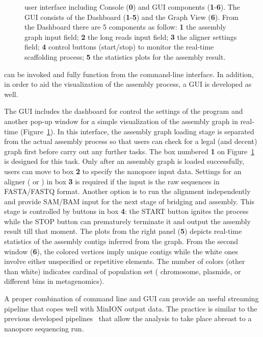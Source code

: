 \begin{figure}[!hpt]
{{    }
}
\caption[\npgraph{} user interface]{\npgraph{} user interface including Console (\textbf{0}) and GUI components (\textbf{1}-\textbf{6}). The GUI consists of the Dashboard (\textbf{1}-\textbf{5}) and the Graph View (\textbf{6}). From the Dashboard there are 5 components as follow: \textbf{1} the assembly graph input field; \textbf{2} the long reads input field; \textbf{3} the aligner settings field; \textbf{4} control buttons (start/stop) to monitor the real-time scaffolding process; \textbf{5} the statistics plots for the assembly result.}
\label{figure:npgraph_gui}
\end{figure}

\npgraph{} can be invoked and fully function from the command-line interface. In addition, in order to aid the visualization of the assembly process, a GUI is developed as well.

The GUI includes the dashboard for control the settings of the program and another pop-up window for a simple visualization of the assembly graph in real-time (Figure~\ref{figure:npgraph_gui}).
In this interface, the assembly graph loading stage is separated from the actual assembly process so that users can check for a legal (and decent) graph first before carry out any further tasks. The box numbered \textbf{1} on Figure~\ref{figure:npgraph_gui} is designed for this task.
Only after an assembly graph is loaded successfully, users can move to box \textbf{2} to specify the nanopore input data.
Settings for an aligner (\bwa{} or \minimap{}) in box \textbf{3} is required if the input is the raw sequences in FASTA/FASTQ format. Another option is to run the alignment independently and provide SAM/BAM input for the next stage of bridging and assembly. This stage is controlled by buttons in box \textbf{4}: the START button ignites the process while the STOP button can prematurely terminate it and output the assembly result till that moment. The plots from the right panel (\textbf{5}) depicts real-time statistics of the assembly contigs inferred from the graph.
From the second window (\textbf{6}), the colored vertices imply unique contigs while the white ones involve either unspecified or repetitive elements. The number of colors (other than white) indicates cardinal of population set (\EG{} chromosome, plasmids, or different bins in metagenomics).

A proper combination of command line and GUI can provide an useful streaming pipeline that copes well with MinION output data. The practice is similar to the previous developed pipelines~\cite{CaoGC2016,Cao2017scaffolding,Nguyen2017barcode} that allow the analysis to take place abreast to a nanopore sequencing run.
